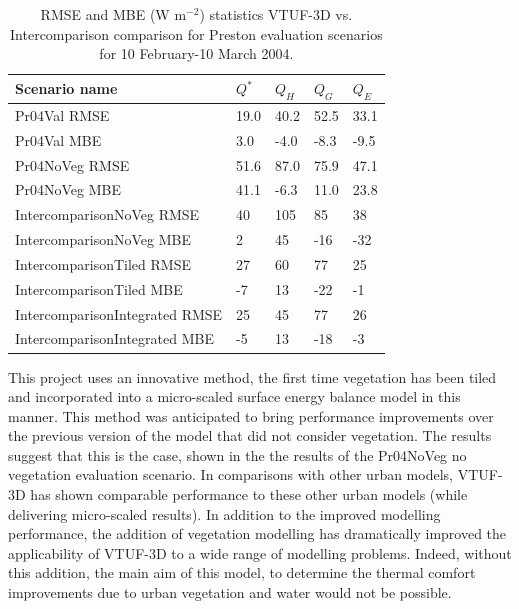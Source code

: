 \documentclass[final,3p,times,authoryear]{elsarticle}
\begin{document}
 \begin{center}
 \begin{table}[!htbp]
 \caption{RMSE and MBE (W m$^{-2}$) statistics VTUF-3D vs. Intercomparison \citep{Best2012} comparison for Preston evaluation scenarios for 10 February-10 March 2004.\label{fig:prestonrmse}} 
 \begin{tabular}{  | l | l | l|l|l| } 
 \hline \textbf{Scenario name} &\textbf{$Q^{*}$}& \textbf{$Q_{H}$}& \textbf{$Q_{G}$}& \textbf{$Q_{E}$}  \\ \hline
 Pr04Val RMSE & 19.0&	40.2&	52.5&	33.1    \\ \hline
   Pr04Val MBE & 3.0&	-4.0&	-8.3&	-9.5    \\ \hline
 Pr04NoVeg RMSE & 51.6&	87.0&	75.9&	47.1  \\ \hline	
   Pr04NoVeg MBE & 41.1&	-6.3&	11.0&	23.8  \\ \hline	
 IntercomparisonNoVeg RMSE & 40&	105&	85&	38   \\ \hline
   IntercomparisonNoVeg MBE & 2&	45&	-16& -32   \\ \hline
 IntercomparisonTiled RMSE &  27&	60&	77&	25  \\ \hline
   IntercomparisonTiled MBE & -7&	13&	-22& -1  \\ \hline
 IntercomparisonIntegrated RMSE & 25&	45&	77&	26   \\ \hline
   IntercomparisonIntegrated MBE & -5&	13&	-18& -3   \\ \hline
 
   \end{tabular} 
 \end{table}
 \end{center} 
 

This project uses an innovative method, the first time vegetation has been tiled and incorporated into a micro-scaled surface energy balance model in this manner. This method was anticipated to bring performance improvements over the previous version of the model that did not consider vegetation. The results suggest that this is the case, shown in the the results of the Pr04NoVeg no vegetation evaluation scenario. In comparisons with other urban models, VTUF-3D has shown comparable performance to these other urban models (while delivering micro-scaled results). In addition to the improved modelling performance, the addition of vegetation modelling has dramatically improved the applicability of VTUF-3D to a wide range of modelling problems. Indeed, without this addition, the main aim of this model, to determine the thermal comfort improvements due to urban vegetation and water would not be possible. 
\end{document}
